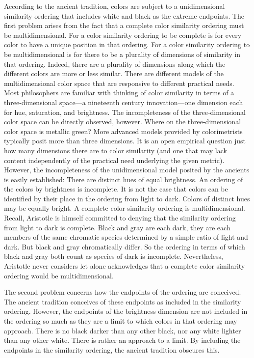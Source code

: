 According to the ancient tradition, colors are subject to a unidimensional similarity ordering that includes white and black as the extreme endpoints. The first problem arises from the fact that a complete color similarity ordering must be multidimensional. For a color similarity ordering to be complete is for every color to have a unique position in that ordering. For a color similarity ordering to be multidimensional is for there to be a plurality of dimensions of similarity in that ordering. Indeed, there are a plurality of dimensions along which the different colors are more or less similar. There are different models of the multidimensional color space that are responsive to different practical needs. Most philosophers are familiar with thinking of color similarity in terms of a three-dimensional space---a nineteenth century innovation---one dimension each for hue, saturation, and brightness. The incompleteness of the three-dimensional color space can be directly observed, however. Where on the three-dimensional color space is metallic green? More advanced models provided by colorimetrists typically posit more than three dimensions. It is an open empirical question just how many dimensions there are to color similarity (and one that may lack content independently of the practical need underlying the given metric). However, the incompleteness of the unidimensional model posited by the ancients is easily established: There are distinct hues of equal brightness. An ordering of the colors by brightness is incomplete. It is not the case that colors can be identified by their place in the ordering from light to dark. Colors of distinct hues may be equally bright. A complete color similarity ordering is multidimensional. Recall, Aristotle is himself committed to denying that the similarity ordering from light to dark is complete. Black and gray are each dark, they are each members of the same chromatic species determined by a simple ratio of light and dark. But black and gray chromatically differ. So the ordering in terms of which black and gray both count as species of dark is incomplete. Nevertheless, Aristotle never considers let alone acknowledges that a complete color similarity ordering would be multidimensional.

The second problem concerns how the endpoints of the ordering are conceived. The ancient tradition conceives of these endpoints as included in the similarity ordering. However, the endpoints of the brightness dimension are not included in the ordering so much as they are a limit to which colors in that ordering may approach. There is no black darker than any other black, nor any white lighter than any other white. There is rather an approach to a limit. By including the endpoints in the similarity ordering, the ancient tradition obscures this.


